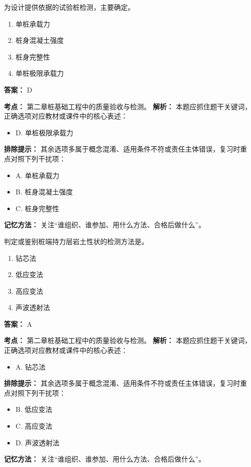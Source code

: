 \documentclass[UTF8,fontset=fandol,11pt]{ctexart}
\begin{document}
\begin{quizbox}[title={第 5 题}]
为设计提供依据的试验桩检测，主要确定。\\
\begin{enumerate}[label=\Alph*.]
\item 单桩承载力
\item 桩身混凝土强度
\item 桩身完整性
\item 单桩极限承载力
\end{enumerate}
\textbf{答案：} D
\vspace{0.25em}
\begin{answerbox}[title={考点解析}]
\textbf{考点：} 第二章桩基础工程中的质量验收与检测。
\textbf{解析：} 本题应抓住题干关键词，正确选项对应教材或课件中的核心表述：
\begin{itemize}
\item D. 单桩极限承载力
\end{itemize}
\textbf{排除提示：} 其余选项多属于概念混淆、适用条件不符或责任主体错误，复习时重点对照下列干扰项：
\begin{itemize}
\item A. 单桩承载力
\item B. 桩身混凝土强度
\item C. 桩身完整性
\end{itemize}
\textbf{记忆方法：} 关注“谁组织、谁参加、用什么方法、合格后做什么”。
\end{answerbox}
\end{quizbox}

\begin{quizbox}[title={第 6 题}]
判定或鉴别桩端持力层岩土性状的检测方法是。\\
\begin{enumerate}[label=\Alph*.]
\item 钻芯法
\item 低应变法
\item 高应变法
\item 声波透射法
\end{enumerate}
\textbf{答案：} A
\vspace{0.25em}
\begin{answerbox}[title={考点解析}]
\textbf{考点：} 第二章桩基础工程中的质量验收与检测。
\textbf{解析：} 本题应抓住题干关键词，正确选项对应教材或课件中的核心表述：
\begin{itemize}
\item A. 钻芯法
\end{itemize}
\textbf{排除提示：} 其余选项多属于概念混淆、适用条件不符或责任主体错误，复习时重点对照下列干扰项：
\begin{itemize}
\item B. 低应变法
\item C. 高应变法
\item D. 声波透射法
\end{itemize}
\textbf{记忆方法：} 关注“谁组织、谁参加、用什么方法、合格后做什么”。
\end{answerbox}
\end{quizbox}
\end{document}
